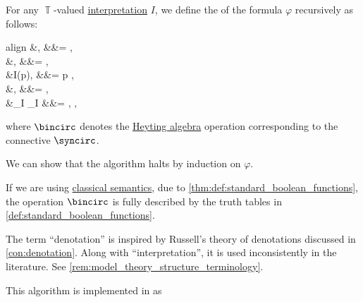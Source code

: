 \begin{algorithm}\label{alg:propositional_denotation}\mimprovised
  For any \( \BbbT \)-valued \hyperref[def:propositional_interpretation]{interpretation} \( I \), we define the  of the formula \( \varphi \) recursively as follows:
  \begin{empheq}[left={\Bracks{\varphi}_I} \coloneqq \empheqlbrace]{align}
    &\semtop,                                   &&\varphi = \syntop,                                         \label{eq:alg:propositional_denotation/top} \\
    &\sembot,                                   &&\varphi = \synbot,                                         \label{eq:alg:propositional_denotation/bot} \\
    &I(p),                                      &&\varphi = p \in {},                                \label{eq:alg:propositional_denotation/prop} \\
    &,                   &&\varphi = \synneg \psi,                                    \label{eq:alg:propositional_denotation/neg} \\
    &\Bracks{\psi}_I \bincirc \Bracks{\theta}_I &&\varphi = \psi \syncirc \theta, {\syncirc} \in {}, \label{eq:alg:propositional_denotation/conn}
  \end{empheq}
  where \( {\bincirc} \) denotes the \hyperref[def:heyting_algebra]{Heyting algebra} operation corresponding to the connective \( \syncirc \).
\end{algorithm}
\begin{defproof}
  We can show that the algorithm halts by induction on \( \varphi \).
\end{defproof}
\begin{comments}
  \item If we are using \hyperref[def:truth_value_algebra/classical]{classical semantics}, due to \cref{thm:def:standard_boolean_functions}, the operation \( {\bincirc} \) is fully described by the truth tables in \cref{def:standard_boolean_functions}.

  \item The term \enquote{denotation} is inspired by Russell's theory of denotations discussed in \cref{con:denotation}. Along with \enquote{interpretation}, it is used inconsistently in the literature. See \cref{rem:model_theory_structure_terminology}.

  \item This algorithm is implemented in \cite{notebook:code} as
  \begin{CodeRefDisplay}
  \end{CodeRefDisplay}
\end{comments}

